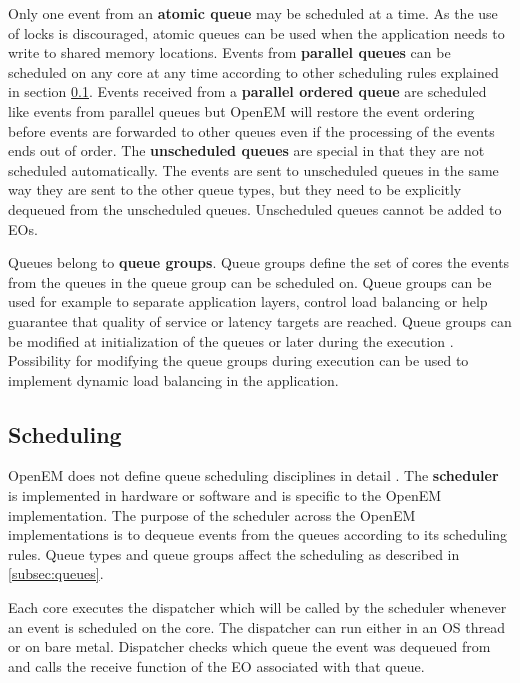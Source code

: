 Only one event from an \textbf{atomic queue} may be scheduled at a time. As the use of locks is discouraged, atomic queues can be used when the application needs to write to shared memory locations. Events from \textbf{parallel queues} can be scheduled on any core at any time according to other scheduling rules explained in section \ref{subsec:schedule}. Events received from a \textbf{parallel ordered queue} are scheduled like events from parallel queues but OpenEM will restore the event ordering before events are forwarded to other queues even if the processing of the events ends out of order. The \textbf{unscheduled queues} are special in that they are not scheduled automatically. The events are sent to unscheduled queues in the same way they are sent to the other queue types, but they need to be explicitly dequeued from the unscheduled queues. Unscheduled queues cannot be added to EOs. \cite{openempage}

Queues belong to \textbf{queue groups}. Queue groups define the set of cores the events from the queues in the queue group can be scheduled on. Queue groups can be used for example to separate application layers, control load balancing or help guarantee that quality of service or latency targets are reached. \cite{openemintro} Queue groups can be modified at initialization of the queues or later during the execution \cite{openempage}. Possibility for modifying the queue groups during execution can be used to implement dynamic load balancing in the application.

\subsection{Scheduling}
\label{subsec:schedule}
OpenEM does not define queue scheduling disciplines in detail \cite{openempage}. The \textbf{scheduler} is implemented in hardware or software and is specific to the OpenEM implementation. The purpose of the scheduler across the OpenEM implementations is to dequeue events from the queues according to its scheduling rules. \cite{openemintro} Queue types and queue groups affect the scheduling as described in \ref{subsec:queues}.  

Each core executes the dispatcher which will be called by the scheduler whenever an event is scheduled on the core. The dispatcher can run either in an OS thread or on bare metal. Dispatcher checks which queue the event was dequeued from and calls the receive function of the EO associated with that queue. \cite{openemintro}

